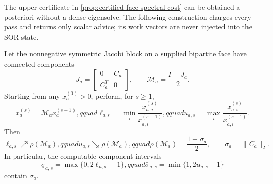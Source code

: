 The upper certificate in \cref{prop:certified-face-spectral-cost} can be
obtained a posteriori without a dense eigensolve.  The following construction
charges every pass and returns only scalar advice; its work vectors are never
injected into the SOR state.

\begin{proposition}
\label{prop:collatz-face-certificate}
Let the nonnegative symmetric Jacobi block on a supplied bipartite face have
connected components
\begin{equation}
 J_a=\begin{bmatrix}0&C_a\\C_a^T&0\end{bmatrix},
 \qquad
 \mathcal M_a=\frac{I+J_a}{2}.
 \label{eq:collatz-component-matrix}
\end{equation}
Starting from any $x_a^{(0)}>0$, perform, for $s\ge1$,
\begin{equation}
 x_a^{(s)}=\mathcal M_ax_a^{(s-1)},qquad
 \ell_{a,s}=\min_i\frac{x_{a,i}^{(s)}}{x_{a,i}^{(s-1)}},qquad
 u_{a,s}=\max_i\frac{x_{a,i}^{(s)}}{x_{a,i}^{(s-1)}}.
 \label{eq:collatz-component-iteration}
\end{equation}
Then
\begin{equation}
 \ell_{a,s}\nearrow\rho(\mathcal M_a),qquad
 u_{a,s}\searrow\rho(\mathcal M_a),qquad
 \rho(\mathcal M_a)=\frac{1+\sigma_a}{2},\qquad
 \sigma_a=\|C_a\|_2.
 \label{eq:collatz-component-bounds}
\end{equation}
In particular, the computable component intervals
\begin{equation}
 \underline\sigma_{a,s}=\max\{0,2\ell_{a,s}-1\},qquad
 \bar\sigma_{a,s}=\min\{1,2u_{a,s}-1\}
 \label{eq:collatz-component-sigma-interval}
\end{equation}
contain $\sigma_a$.


\end{proposition}
